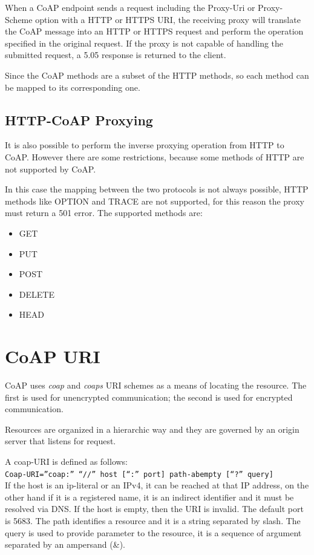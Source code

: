 	When a CoAP endpoint sends a request including the Proxy-Uri or Proxy-Scheme option with a HTTP or HTTPS URI, the receiving proxy will translate the CoAP message into an HTTP or HTTPS request and perform the operation specified in the original request.\newline
	If the proxy is not capable of handling the submitted request, a 5.05 response is returned to the client.\newline

	Since the CoAP methods are a subset of the HTTP methods, so each method can be mapped to its corresponding one.

	
	\subsection{HTTP-CoAP Proxying}
	It is also possible to perform the inverse proxying operation from HTTP to CoAP.\newline
	However there are some restrictions, because some methods of HTTP are not supported by CoAP.
	
	In this case the mapping between the two protocols is not always possible, HTTP methods like
	OPTION and TRACE are not supported, for this reason the proxy must return a 501 error.\newline
	The supported methods are:
	\begin{itemize}
		\item GET
		\item PUT
		\item POST
		\item DELETE
		\item HEAD
	\end{itemize}
	
	\section{CoAP URI}
	CoAP uses \emph{coap} and \emph{coaps} URI schemes as a means of locating the resource.
	The first is used for unencrypted communication; the second is used for encrypted communication.
	
	Resources are organized in a hierarchic way and they are governed by an origin server that listens for request.
	
	A coap-URI is defined as follows:\\
	\texttt{Coap-URI=”coap:” “//” host [“:” port] path-abempty [“?” query]}\\
	If the host is an ip-literal or an IPv4, it can be reached at that IP address, on the other hand if it is a registered name, it is an indirect identifier and it must be resolved via DNS.\newline
	If the host is empty, then the URI is invalid.\newline
	The default port is 5683.\newline
	The path identifies a resource and it is a string separated by slash.\newline
	The query is used to provide parameter to the resource, it is a sequence of argument separated by an ampersand (\&).
	
